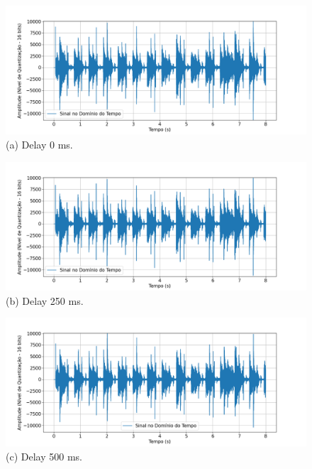 \begin{figure}[htpb]
    \centering
    \begin{minipage}[b]{0.7\textwidth}
        \centering
        \includegraphics[width=\textwidth]{figuras/fig74.png}
        \vspace{0.3cm} %
        (a) Delay 0 ms.
    \end{minipage}
    \hspace{0.5cm} %

    \begin{minipage}[b]{0.7\textwidth}
        \centering
        \includegraphics[width=\textwidth]{figuras/fig75.png}
        \vspace{0.3cm} %
        (b) Delay 250 ms.
    \end{minipage}
    
    \vspace{0.5cm} %

    \begin{minipage}[b]{0.7\textwidth}
        \centering
        \includegraphics[width=\textwidth]{figuras/fig76.png}
        \vspace{0.3cm} %
        (c) Delay 500 ms.
    \end{minipage}
    \hspace{0.5cm} %


\end{figure}
